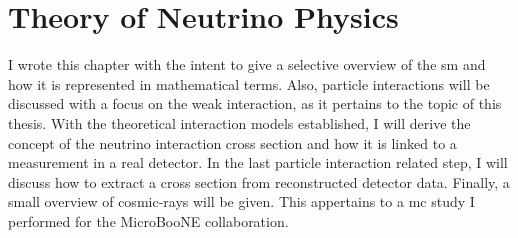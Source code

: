 

\chapter{Theory of Neutrino Physics} \label{sec:Theory}
I wrote this chapter with the intent to give a selective overview of the \gls{sm} and how it is represented in mathematical terms. Also, particle interactions will be discussed with a focus on the weak interaction, as it pertains to the topic of this thesis. With the theoretical interaction models established, I will derive the concept of the neutrino interaction cross section and how it is linked to a measurement in a real detector. In the last particle interaction related step, I will discuss how to extract a cross section from reconstructed detector data. Finally, a small overview of cosmic-rays will be given. This appertains to a \gls{mc} study I performed for the MicroBooNE collaboration.

